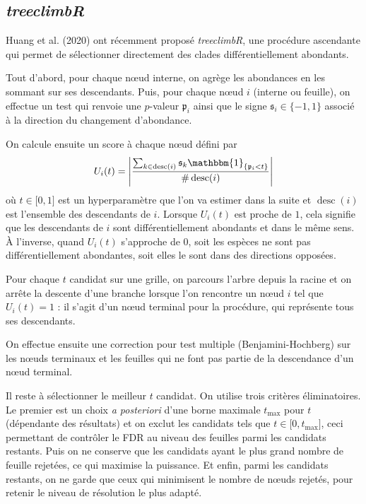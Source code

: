 \documentclass[12pt,a4paper]{reedthesis}
\newcommand \indic {\mathbbm{1}}
\newcommand \pv {\mathfrak{p}}
\newcommand \sign {\mathfrak{s}}
\DeclareMathOperator*{\desc}{desc}
\theoremstyle{definition}
\theoremstyle{definition}
\theoremstyle{definition}
\theoremstyle{remark}
\begin{document}
\hypertarget{treeclimbr}{%
\subsection{\texorpdfstring{\emph{treeclimbR}}{treeclimbR}}\label{treeclimbr}}

Huang et al. (2020) ont récemment proposé \emph{treeclimbR}, une procédure ascendante qui permet de sélectionner directement des clades différentiellement abondants.

Tout d'abord, pour chaque nœud interne, on agrège les abondances en les sommant sur ses descendants. Puis, pour chaque nœud \(i\) (interne ou feuille), on effectue un test qui renvoie une \(p\)-valeur \(\pv_i\) ainsi que le signe \(\sign_i\in \{-1,1\}\) associé à la direction du changement d'abondance.

On calcule ensuite un score à chaque nœud défini par
\begin{equation*}
U_i(t) = \left|\frac{\sum_{k \in \desc(i)} \sign_k \indic_{\{\pv_i < t\}}}{\#\desc(i)}\right|
\end{equation*}
où \(t \in \mathopen[0,1\mathclose]\) est un hyperparamètre que l'on va estimer dans la suite et \(\desc(i)\) est l'ensemble des descendants de \(i\). Lorsque \(U_i(t)\) est proche de \(1\), cela signifie que les descendants de \(i\) sont différentiellement abondants et dans le même sens. À l'inverse, quand \(U_i(t)\) s'approche de \(0\), soit les espèces ne sont pas différentiellement abondantes, soit elles le sont dans des directions opposées.

Pour chaque \(t\) candidat sur une grille, on parcours l'arbre depuis la racine et on arrête la descente d'une branche lorsque l'on rencontre un nœud \(i\) tel que \(U_i(t) = 1\) : il s'agit d'un nœud terminal pour la procédure, qui représente tous ses descendants.

On effectue ensuite une correction pour test multiple (Benjamini-Hochberg) sur les nœuds terminaux et les feuilles qui ne font pas partie de la descendance d'un nœud terminal.

Il reste à sélectionner le meilleur \(t\) candidat. On utilise trois critères éliminatoires. Le premier est un choix \emph{a posteriori} d'une borne maximale \(t_{\max}\) pour \(t\) (dépendante des résultats) et on exclut les candidats tels que \(t\in\mathopen[0, t_{\max}\mathclose]\), ceci permettant de contrôler le FDR au niveau des feuilles parmi les candidats restants. Puis on ne conserve que les candidats ayant le plus grand nombre de feuille rejetées, ce qui maximise la puissance. Et enfin, parmi les candidats restants, on ne garde que ceux qui minimisent le nombre de nœuds rejetés, pour retenir le niveau de résolution le plus adapté.
\end{document}
